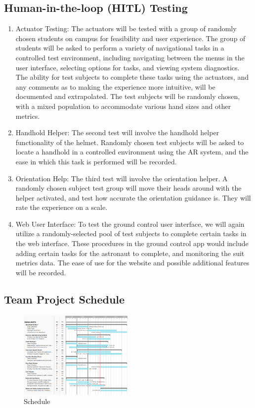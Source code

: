 \documentclass{article}
\let\Oldsubsection\subsection
\renewcommand{\subsection}{\FloatBarrier\Oldsubsection}
\begin{document}
\subsection{Human-in-the-loop (HITL) Testing}

\begin{enumerate}
\item Actuator Testing: The actuators will be tested with a group of 
randomly chosen students on campus for feasibility and user experience. 
The group of students will be asked to perform a variety of navigational 
tasks in a controlled test environment, including navigating between the 
menus in the user interface, selecting options for tasks, and viewing 
system diagnostics. The ability for test subjects to complete these 
tasks using the actuators, and any comments as to making the experience 
more intuitive, will be documented and extrapolated. The test subjects 
will be randomly chosen, with a mixed population to accommodate various 
hand sizes and other metrics.
\item Handhold Helper: The second test will involve the handhold helper 
functionality of the helmet. Randomly chosen test subjects will be asked 
to locate a handhold in a controlled environment using the AR system, 
and the ease in which this task is performed will be recorded.
\item Orientation Help: The third test will involve the orientation 
helper. A randomly chosen subject test group will move their heads 
around with the helper activated, and test how accurate the orientation 
guidance is. They will rate the experience on a scale.
\item Web User Interface: To test the ground control user interface, we 
will again utilize a randomly-selected pool of test subjects to complete 
certain tasks in the web interface. These procedures in the ground 
control app would include adding certain tasks for the astronaut to 
complete, and monitoring the suit metrics data. The ease of use for the 
website and possible additional features will be recorded.
\end{enumerate}

\subsection{Team Project Schedule}

\begin{figure}[!htb]
  \centering
  \includegraphics[width=0.5\textwidth]{assets/supertaskschedule.png}
  \caption{Schedule}
  \label{fig:supertaskschedule}
\end{figure}
\end{document}
